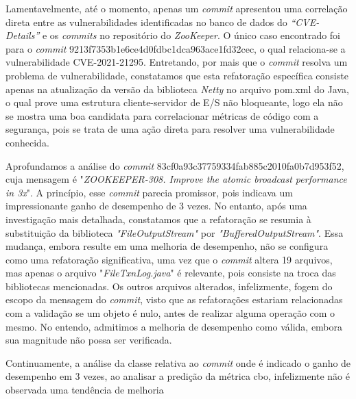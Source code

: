 Lamentavelmente, até o momento, apenas um \textit{commit} apresentou uma correlação direta entre as vulnerabilidades identificadas no banco de dados do \textit{``CVE-Details''} e os \textit{commits} no repositório do \textit{ZooKeeper}. O único caso encontrado foi para o \textit{commit} 9213f7353b1e6ce4d0fdbc1dca963ace1fd32cec, o qual relaciona-se a vulnerabilidade CVE-2021-21295. Entretando, por mais que o \textit{commit} resolva um problema de vulnerabilidade, constatamos que esta refatoração específica consiste apenas na atualização da versão da biblioteca \textit{Netty} no arquivo pom.xml do Java, o qual prove uma estrutura cliente-servidor de E/S não bloqueante, logo ela não se mostra uma boa candidata para correlacionar métricas de código com a segurança, pois se trata de uma ação direta para resolver uma vulnerabilidade conhecida.

Aprofundamos a análise do \textit{commit} 83cf0a93c37759334fab885c2010fa0b7d953f52, cuja mensagem é "\textit{ZOOKEEPER-308. Improve the atomic broadcast performance in 3x}". A princípio, esse \textit{commit} parecia promissor, pois indicava um impressionante ganho de desempenho de 3 vezes. No entanto, após uma investigação mais detalhada, constatamos que a refatoração se resumia à substituição da biblioteca \textit{"FileOutputStream"} por \textit{"BufferedOutputStream"}. Essa mudança, embora resulte em uma melhoria de desempenho, não se configura como uma refatoração significativa, uma vez que o \textit{commit} altera 19 arquivos, mas apenas o arquivo "\textit{FileTxnLog.java}" é relevante, pois consiste na troca das bibliotecas mencionadas. Os outros arquivos alterados, infelizmente, fogem do escopo da mensagem do \textit{commit}, visto que as refatorações estariam relacionadas com a validação se um objeto é nulo, antes de realizar alguma operação com o mesmo. No entendo, admitimos a melhoria de desempenho como válida, embora sua magnitude não possa ser verificada.

Continuamente, a análise da classe relativa ao \textit{commit} onde é indicado o ganho de desempenho em 3 vezes, ao analisar a predição da métrica \gls{cbo}, infelizmente não é observada uma tendência de melhoria

